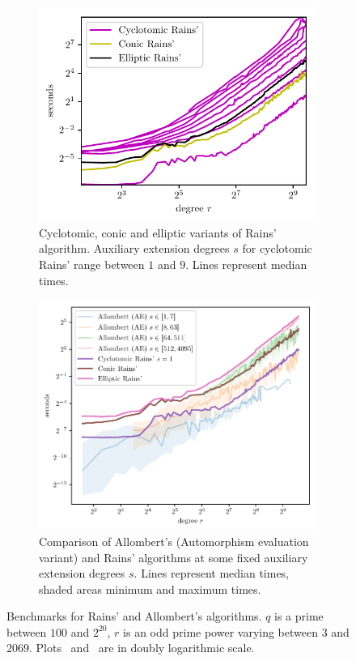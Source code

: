 \begin{figure}
  \begin{subfigure}{.48\textwidth}
    \noindent
    \includegraphics[width=\mywidth]{ffisom/bench-rains}
    \caption{Cyclotomic, conic and elliptic variants of Rains'
      algorithm.  Auxiliary extension degrees $s$ for cyclotomic
      Rains' range between $1$ and $9$. Lines represent median times.}
    \label{fig:bench:rains}
  \end{subfigure}
  \hfill
  \begin{subfigure}{.48\textwidth}
    \noindent
    \includegraphics[width=\mywidth]{ffisom/bench-all}
    \caption{Comparison of Allombert's (Automorphism evaluation
      variant) and Rains' algorithms at some fixed auxiliary extension
      degrees $s$. Lines represent median times, shaded areas minimum
      and maximum times.}
    \label{fig:bench:all}
  \end{subfigure}

  \caption{Benchmarks for Rains' and Allombert's algorithms. $q$ is a
    prime between $100$ and $2^{20}$, $r$ is an odd prime power
    varying between $3$ and $2069$.  Plots~
    and~ are in doubly logarithmic scale.}
  \label{fig:bench}
\end{figure}


